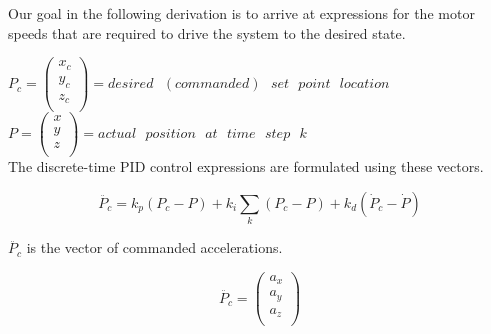 Our goal in the following derivation is to arrive at expressions for the motor speeds that are required to drive the system to the desired state.


$P_c = \left( \begin{array}{c}
x_c\\y_c\\z_c\\
\end{array}\right) = desired\text{ } (commanded)\text{ }set\text{ }point\text{ }location $\\

$P = \left( \begin{array}{c}
x\\y\\z\\
\end{array}\right) = actual \text{ }position\text{ }at\text{ }time\text{ }step\text{ }k$\\

The discrete-time PID control expressions are formulated using these vectors.

\begin{equation}
    \label{eq:acc_comm}
    \ddot{P_c} = k_p(P_c - P) + k_i \sum_k (P_c-P) + k_d(\dot{P}_c - \dot{P})
\end{equation}






$\ddot{P_c}$ is the vector of commanded accelerations.

\begin{equation}
    \ddot{P_c} = \left( \begin{array}{c}
    a_x\\a_y\\a_z\\
    \end{array}\right)
\end{equation}

